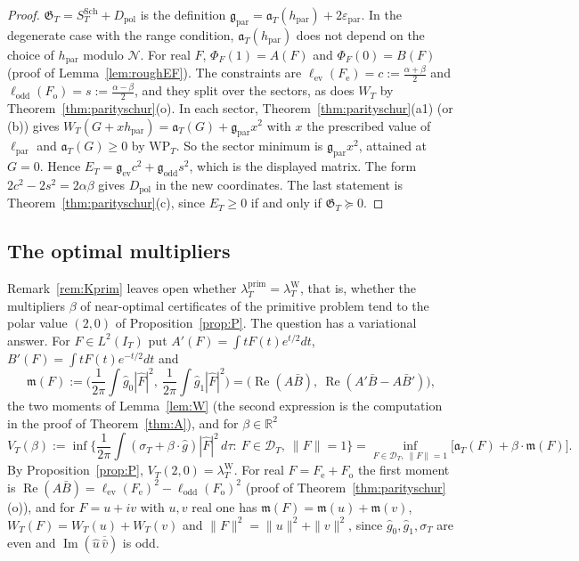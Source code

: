 \documentclass[11pt]{amsart}
\theoremstyle{definition}
\theoremstyle{remark}
\newcommand{\R}{\mathbb R}
\newcommand{\Rel}{\operatorname{Re}}
\newcommand{\Iml}{\operatorname{Im}}
\newcommand{\IT}{I_T}
\newcommand{\lamP}{\lambda^{\mathrm{prim}}_T}
\newcommand{\lamW}{\lambda^{\mathrm W}_T}
\newcommand{\sT}{\sigma_T}
\newcommand{\gh}[1]{\widehat g_{#1}}
\newcommand{\Fh}{\widehat F}
\begin{document}
\begin{proof}
$\mathfrak G_T=S^{\mathrm{Sch}}_T+D_{\mathrm{pol}}$ is the definition $\mathfrak g_{\mathrm{par}}=\mathfrak a_T(h_{\mathrm{par}})+2\varepsilon_{\mathrm{par}}$. In the
degenerate case with the range condition, $\mathfrak a_T(h_{\mathrm{par}})$ does not depend on the choice of $h_{\mathrm{par}}$
modulo $\mathcal N$. For real $F$, $\Phi_F(1)=A(F)$ and $\Phi_F(0)=B(F)$ (proof of Lemma~\ref{lem:roughEF}). The
constraints are $\ell_{\mathrm{ev}}(F_{\mathrm e})=c:=\frac{\alpha+\beta}2$ and $\ell_{\mathrm{odd}}(F_{\mathrm o})=s:=\frac{\alpha-\beta}2$,
and they split over the sectors, as does $W_T$ by Theorem~\ref{thm:parityschur}(o). In each sector,
Theorem~\ref{thm:parityschur}(a1) (or (b)) gives $W_T(G+xh_{\mathrm{par}})=\mathfrak a_T(G)+\mathfrak g_{\mathrm{par}}x^2$ with $x$ the
prescribed value of $\ell_{\mathrm{par}}$ and $\mathfrak a_T(G)\ge0$ by $\mathrm{WP}_T$. So the sector minimum is
$\mathfrak g_{\mathrm{par}}x^2$, attained at $G=0$. Hence $E_T=\mathfrak g_{\mathrm{ev}}c^2+\mathfrak g_{\mathrm{odd}}s^2$, which is the displayed
matrix. The form $2c^2-2s^2=2\alpha\beta$ gives $D_{\mathrm{pol}}$ in the new coordinates. The last statement is
Theorem~\ref{thm:parityschur}(c), since $E_T\ge0$ if and only if $\mathfrak G_T\succeq0$.
\end{proof}

\subsection{The optimal multipliers}\label{subsec:mult}
Remark~\ref{rem:Kprim} leaves open whether $\lamP=\lamW$, that is, whether the multipliers $\beta$ of
near-optimal certificates of the primitive problem tend to the polar value $(2,0)$ of
Proposition~\ref{prop:P}. The question has a variational answer. For $F\in L^2(\IT)$ put
$A'(F)=\int tF(t)e^{t/2}dt$, $B'(F)=\int tF(t)e^{-t/2}dt$ and
\[
\mathfrak m(F):=\Big(\frac1{2\pi}\int\gh0|\Fh|^2,\ \frac1{2\pi}\int\gh1|\Fh|^2\Big)
=\big(\Rel(A\bar B),\ \Rel(A'\bar B-A\bar B')\big),
\]
the two moments of Lemma~\ref{lem:W} (the second expression is the computation in the proof of
Theorem~\ref{thm:A}), and for $\beta\in\R^2$
\[
V_T(\beta):=\inf\Big\{\frac1{2\pi}\int(\sT+\beta\cdot\widehat g)|\Fh|^2\,d\tau:\ F\in\mathcal D_T,\ \|F\|=1\Big\}
=\inf_{F\in\mathcal D_T,\ \|F\|=1}\big[\mathfrak a_T(F)+\beta\cdot\mathfrak m(F)\big].
\]
By Proposition~\ref{prop:P}, $V_T(2,0)=\lamW$. For real $F=F_{\mathrm e}+F_{\mathrm o}$ the first moment is
$\Rel(A\bar B)=\ell_{\mathrm{ev}}(F_{\mathrm e})^2-\ell_{\mathrm{odd}}(F_{\mathrm o})^2$ (proof of
Theorem~\ref{thm:parityschur}(o)), and for $F=u+iv$ with $u,v$ real one has $\mathfrak m(F)=\mathfrak m(u)+\mathfrak m(v)$,
$W_T(F)=W_T(u)+W_T(v)$ and $\|F\|^2=\|u\|^2+\|v\|^2$, since $\gh0,\gh1,\sT$ are even and
$\Iml(\widehat u\,\overline{\widehat v})$ is odd.
\end{document}
